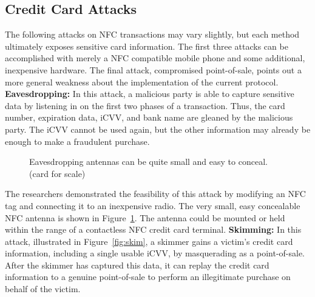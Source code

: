 \documentclass{sig-alternate}
\begin{document}
\subsection{Credit Card Attacks}
\label{sec:attacks}
The following attacks on NFC transactions may vary slightly, but each method ultimately exposes sensitive card information. The first three attacks can be accomplished with merely a NFC compatible mobile phone and some additional, inexpensive hardware. The final attack, compromised point-of-sale, points out a more general weakness about the implementation of the current protocol.
\vspace{2mm}\newline
\noindent\textbf{Eavesdropping:}
In this attack, a malicious party is able to capture sensitive data by listening in on the first two phases of a transaction. Thus, the card number, expiration data, iCVV, and bank name are gleaned by the malicious party. The iCVV cannot be used again, but the other information may already be enough to make a fraudulent purchase.

\begin{figure}
\centering
{}
\caption{Eavesdropping antennas can be quite small and easy to conceal.~\cite{CC2016} (card for scale)}
\label{fig:antenna}
\end{figure}

The researchers demonstrated the feasibility of this attack by modifying an NFC tag and connecting it to an inexpensive radio. The very small, easy concealable NFC antenna is shown in Figure~\ref{fig:antenna}. The antenna could be mounted or held within the range of a contactless NFC credit card terminal.
\vspace{2mm}\newline
\noindent\textbf{Skimming:}
In this attack, illustrated in Figure~\ref{fig:skim}, a skimmer gains a victim's credit card information, including a single usable iCVV, by masquerading as a point-of-sale. After the skimmer has captured this data, it can replay the credit card information to a genuine point-of-sale to perform an illegitimate purchase on behalf of the victim.
\end{document}
